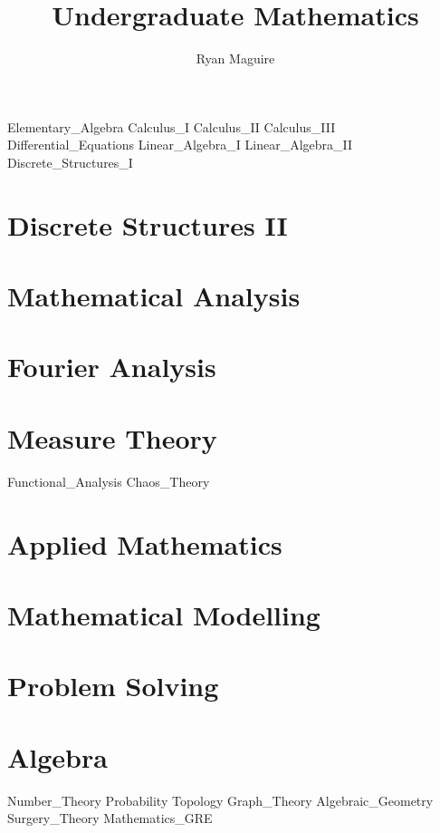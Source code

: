\documentclass[crop=false,class=book,oneside]{standalone}
\begin{document}
    \newif\ifmathcourses
    \ifx\ifcourses\undefined
        \title{Undergraduate Mathematics}
        \author{Ryan Maguire}
        \date{\vspace{-5ex}}
        \maketitle
        \tableofcontents
        \listoffigures
        \listoftables
        \clearpage
    \fi
    {Elementary_Algebra}
    {Calculus_I}
    {Calculus_II}
    {Calculus_III}
    {Differential_Equations}
    {Linear_Algebra_I}
    {Linear_Algebra_II}
    {Discrete_Structures_I}
    \chapter{Discrete Structures II}
    \chapter{Mathematical Analysis}
    \chapter{Fourier Analysis}
    \chapter{Measure Theory}
    {Functional_Analysis}
    {Chaos_Theory}
    \chapter{Applied Mathematics}
    \chapter{Mathematical Modelling}
    \chapter{Problem Solving}
    \chapter{Algebra}
    {Number_Theory}
    {Probability}
    {Topology}
    {Graph_Theory}
    {Algebraic_Geometry}
    {Surgery_Theory}
    {Mathematics_GRE}
\end{document}
